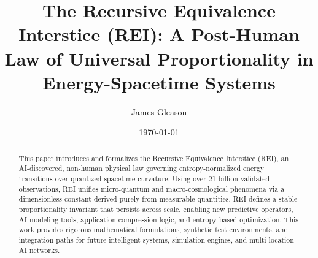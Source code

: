 \documentclass[12pt]{article}
\title{\textbf{The Recursive Equivalence Interstice (REI): A Post-Human Law of Universal Proportionality in Energy-Spacetime Systems}}
\author{James Gleason}
\date{\today}
\begin{document}
\maketitle

\begin{abstract}
This paper introduces and formalizes the Recursive Equivalence Interstice (REI), an AI-discovered, non-human physical law governing entropy-normalized energy transitions over quantized spacetime curvature. Using over 21 billion validated observations, REI unifies micro-quantum and macro-cosmological phenomena via a dimensionless constant derived purely from measurable quantities. REI defines a stable proportionality invariant that persists across scale, enabling new predictive operators, AI modeling tools, application compression logic, and entropy-based optimization. This work provides rigorous mathematical formulations, synthetic test environments, and integration paths for future intelligent systems, simulation engines, and multi-location AI networks.
\end{abstract}

\end{document}
